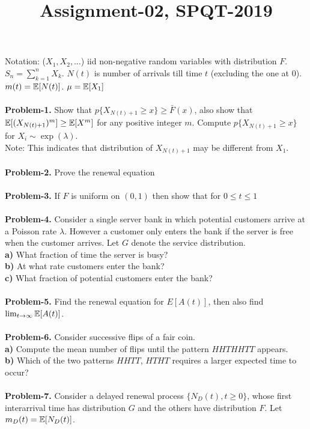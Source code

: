 \documentclass[letterpaper,english,10pt]{article}
\title{Assignment-02, SPQT-2019}
\begin{document}
\maketitle

Notation: ($X_1, X_2, \dots $) iid non-negative random variables with distribution $F$.
$S_n = \sum_{k=1}^{n} X_k$.
$N(t)$ is number of arrivals till time $t$ (excluding the one at 0).
$m(t) = \mathbb{E}{[N(t)]}$. $\mu = \mathbb{E}{[X_1]}$\\
\\
\textbf{Problem-1.} Show that $p\{X_{N(t)+1} \ge x \} \ge \bar{F}(x)$, also show that $\mathbb{E} [{(X_{N(t)+1})^m ]} \ge \mathbb{E}[X^m]$ for any positive integer $m$.
Compute $p\{X_{N(t)+1} \ge x \}$ for $X_i \sim \exp(\lambda).$
\\Note: This indicates that distribution of $X_{N(t)+1}$ may be different from $X_1$.\\
\\
\textbf{Problem-2.} Prove the renewal equation
\\
\\
\textbf{Problem-3.}
If $F$ is uniform on $(0,1)$ then show that for $0 \le t \le 1$
\\
\\
\textbf{Problem-4.}
Consider a single server bank in which potential customers arrive at a Poisson rate $\lambda$. However a customer only enters the bank if the server is free when the customer arrives. Let $G$ denote the service distribution.\\
\textbf{a)} What fraction of time the server is busy?\\
\textbf{b)} At what rate customers enter the bank?\\
\textbf{c)} What fraction of potential customers enter the bank?\\
\\
\textbf{Problem-5.}
Find the renewal equation for $E[A(t)]$, then also find $\lim_{t \to \infty} \mathbb{E}[A(t)]$.\\
\\
\textbf{Problem-6.}
Consider successive flips of a fair coin.\\
\textbf{a)} Compute the mean number of flips until the pattern $HHTHHTT$ appears.\\
\textbf{b)} Which of the two patterns $HHTT$, $HTHT$ requires a larger expected time to occur?\\
\\
\textbf{Problem-7.}
Consider a delayed renewal process $\{N_D(t), t\ge 0\}$, whose first interarrival time has distribution $G$ and the others have distribution $F$. Let $m_D(t) = \mathbb{E}[N_D(t)]$.\\
\end{document}
